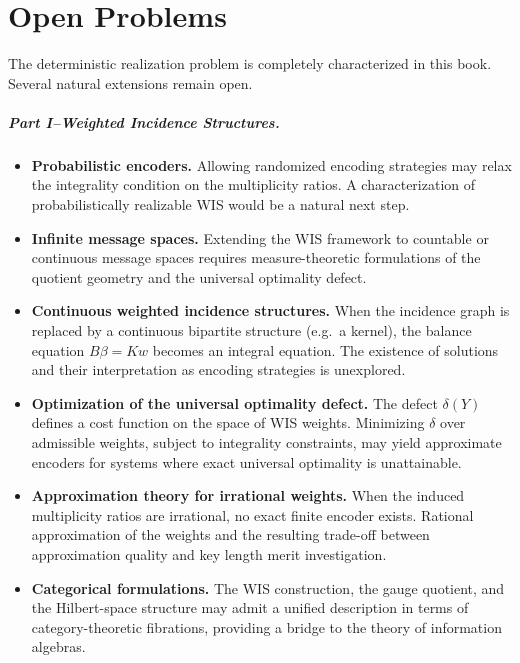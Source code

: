 ﻿\chapter[Open Problems]{Open Problems}\label{ch:sec:open}
The deterministic realization problem is completely characterized in this book.  Several natural extensions remain open.
\paragraph{Part I--Weighted Incidence Structures.}
\begin{itemize}
\item \textbf{Probabilistic encoders.}  Allowing randomized encoding strategies may relax the integrality condition on the multiplicity ratios.  A characterization of probabilistically realizable WIS would be a natural next step.
\item \textbf{Infinite message spaces.}  Extending the WIS framework to countable or continuous message spaces requires measure-theoretic formulations of the quotient geometry and the universal optimality defect.
\item \textbf{Continuous weighted incidence structures.}  When the incidence graph is replaced by a continuous bipartite structure (e.g.\ a kernel), the balance equation \(B\beta = Kw\) becomes an integral equation.  The existence of solutions and their interpretation as encoding strategies is unexplored.
\item \textbf{Optimization of the universal optimality defect.}  The defect \(\delta(Y)\) defines a cost function on the space of WIS weights.  Minimizing \(\delta\) over admissible weights, subject to integrality constraints, may yield approximate encoders for systems where exact universal optimality is unattainable.
\item \textbf{Approximation theory for irrational weights.}  When the induced multiplicity ratios are irrational, no exact finite encoder exists.  Rational approximation of the weights and the resulting trade-off between approximation quality and key length merit investigation.
\item \textbf{Categorical formulations.}  The WIS construction, the gauge quotient, and the Hilbert-space structure may admit a unified description in terms of category-theoretic fibrations, providing a bridge to the theory of information algebras.
\end{itemize}
